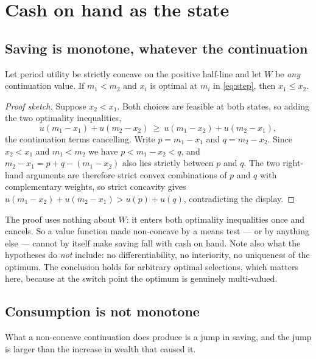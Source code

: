 \section{Cash on hand as the state}\label{sec:cash}

\subsection{Saving is monotone, whatever the continuation}

\begin{theorem}\label{thm:topkis}
Let period utility be strictly concave on the positive half-line and let $W$ be \emph{any}
continuation value. If $m_1<m_2$ and $x_i$ is optimal at $m_i$ in \eqref{eq:step}, then
$x_1\le x_2$.
\end{theorem}

\begin{proof}[Proof sketch]
Suppose $x_2<x_1$. Both choices are feasible at both states, so adding the two optimality
inequalities,
\[
  u(m_1-x_1)+u(m_2-x_2)\ \ge\ u(m_1-x_2)+u(m_2-x_1),
\]
the continuation terms cancelling. Write $p=m_1-x_1$ and $q=m_2-x_2$. Since $x_2<x_1$ and
$m_1<m_2$ we have $p<m_1-x_2<q$, and $m_2-x_1=p+q-(m_1-x_2)$ also lies strictly between $p$ and
$q$. The two right-hand arguments are therefore strict convex combinations of $p$ and $q$ with
complementary weights, so strict concavity gives $u(m_1-x_2)+u(m_2-x_1)>u(p)+u(q)$, contradicting
the display.
\end{proof}

The proof uses nothing about $W$: it enters both optimality inequalities once and cancels. So a
value function made non-concave by a means test --- or by anything else --- cannot by itself make
saving fall with cash on hand. Note also what the hypotheses do \emph{not} include: no
differentiability, no interiority, no uniqueness of the optimum. The conclusion holds for arbitrary
optimal selections, which matters here, because at the switch point the optimum is genuinely
multi-valued.

\subsection{Consumption is not monotone}

What a non-concave continuation does produce is a jump in saving, and the jump is larger than the
increase in wealth that caused it.

